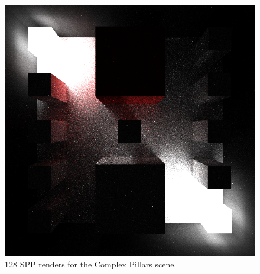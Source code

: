 \documentclass[ %
                    author={Callum Pearce},
                supervisor={Dr. Neill Campbell},
                    degree={MEng},
                     title={Learning the incident radiance for a continuous state space rather than a discrete one is more beneficial for Importance Sampling in Monte Carlo Path tracing},
                  subtitle={},
                      type={research},
                      year={2019} ]{dissertation}
\begin{document}
\begin{figure}[h]
\endminipage\hspace{1em}
  \includegraphics[width=\textwidth]{images/renders/complex_pillars/nn.png}
\endminipage
\caption{128 SPP renders for the Complex Pillars scene.}
\label{fig:complex_light}
\end{figure}
\end{document}
